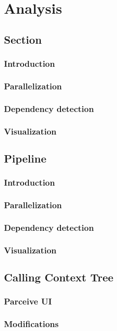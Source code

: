\section{Analysis}

\subsection{Section}
\subsubsection{Introduction}
\subsubsection{Parallelization}
\subsubsection{Dependency detection}
\subsubsection{Visualization}

\subsection{Pipeline}
\subsubsection{Introduction}
\subsubsection{Parallelization}
\subsubsection{Dependency detection}
\subsubsection{Visualization}

\subsection{Calling Context Tree}
\subsubsection{Parceive UI}
\subsubsection{Modifications}





